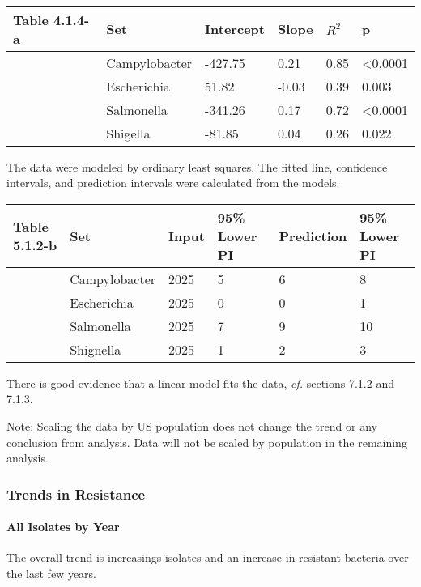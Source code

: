 \documentclass[11pt]{article}
\begin{document}
    \begin{center}
    \end{center}
    { \hspace*{\fill} \\}
    
    \begin{longtable}[]{@{}llllll@{}}
\toprule
Table 4.1.4-a & Set & Intercept & Slope & \(R^{2}\) & p\tabularnewline
\midrule
\endhead
& Campylobacter & -427.75 & 0.21 & 0.85 &
\textless{}0.0001\tabularnewline
& Escherichia & 51.82 & -0.03 & 0.39 & 0.003\tabularnewline
& Salmonella & -341.26 & 0.17 & 0.72 & \textless{}0.0001\tabularnewline
& Shigella & -81.85 & 0.04 & 0.26 & 0.022\tabularnewline
\bottomrule
\end{longtable}

The data were modeled by ordinary least squares. The fitted line,
confidence intervals, and prediction intervals were calculated from the
models.

\begin{longtable}[]{@{}llllll@{}}
\toprule
Table 5.1.2-b & Set & Input & 95\% Lower PI & Prediction & 95\% Lower
PI\tabularnewline
\midrule
\endhead
& Campylobacter & 2025 & 5 & 6 & 8\tabularnewline
& Escherichia & 2025 & 0 & 0 & 1\tabularnewline
& Salmonella & 2025 & 7 & 9 & 10\tabularnewline
& Shignella & 2025 & 1 & 2 & 3\tabularnewline
\bottomrule
\end{longtable}

There is good evidence that a linear model fits the data, \emph{cf.}
sections 7.1.2 and 7.1.3.

    Note: Scaling the data by US population does not change the trend or any
conclusion from analysis. Data will not be scaled by population in the
remaining analysis.

    \hypertarget{trends-in-resistance}{%
\subsubsection{Trends in Resistance}\label{trends-in-resistance}}

    \hypertarget{all-isolates-by-year}{%
\paragraph{All Isolates by Year}\label{all-isolates-by-year}}

    The overall trend is increasings isolates and an increase in resistant
bacteria over the last few years.
\end{document}
